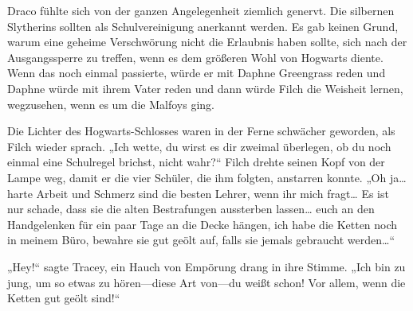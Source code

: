 Draco fühlte sich von der ganzen Angelegenheit ziemlich genervt. Die silbernen Slytherins sollten als Schulvereinigung anerkannt werden. Es gab keinen Grund, warum eine geheime Verschwörung nicht die Erlaubnis haben sollte, sich nach der Ausgangssperre zu treffen, wenn es dem größeren Wohl von Hogwarts diente. Wenn das noch einmal passierte, würde er mit Daphne Greengrass reden und Daphne würde mit ihrem Vater reden und dann würde Filch die Weisheit lernen, wegzusehen, wenn es um die Malfoys ging.

Die Lichter des Hogwarts-Schlosses waren in der Ferne schwächer geworden, als Filch wieder sprach. „Ich wette, du wirst es dir zweimal überlegen, ob du noch einmal eine Schulregel brichst, nicht wahr?“ Filch drehte seinen Kopf von der Lampe weg, damit er die vier Schüler, die ihm folgten, anstarren konnte. „Oh ja… harte Arbeit und Schmerz sind die besten Lehrer, wenn ihr mich fragt… Es ist nur schade, dass sie die alten Bestrafungen aussterben lassen… euch an den Handgelenken für ein paar Tage an die Decke hängen, ich habe die Ketten noch in meinem Büro, bewahre sie gut geölt auf, falls sie jemals gebraucht werden…“

„Hey!“ sagte Tracey, ein Hauch von Empörung drang in ihre Stimme. „Ich bin zu jung, um so etwas zu hören—diese Art von—du weißt schon! Vor allem, wenn die Ketten gut geölt sind!“

